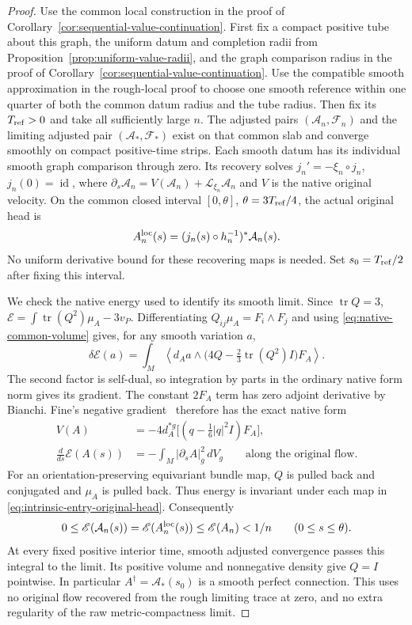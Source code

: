 \documentclass[11pt]{article}
\numberwithin{equation}{section}
\theoremstyle{definition}
\theoremstyle{remark}
\DeclareMathOperator{\tr}{tr}
\newcommand{\id}{\operatorname{id}}
\begin{document}
\begin{proof}
Use the common local construction in the proof of
Corollary~\ref{cor:sequential-value-continuation}.
First fix a compact positive tube about this graph, the
uniform datum and completion radii from
Proposition~\ref{prop:uniform-value-radii}, and the graph
comparison radius in the proof of
Corollary~\ref{cor:sequential-value-continuation}.
Use the compatible smooth approximation in the rough-local
proof to choose one smooth reference within one quarter of
both the common datum radius and the tube radius. Then fix
its $T_{\rm ref}>0$ and take all sufficiently large $n$.
The adjusted pairs $(\mathcal A_n,\mathcal F_n)$ and the
limiting adjusted pair $(\mathcal A_*,\mathcal F_*)$ exist on
that common slab and converge smoothly on compact positive-time
strips. Each smooth datum has its individual smooth graph
comparison through zero. Its recovery solves
$j_n'=-\xi_n\circ j_n$, $j_n(0)=\id$, where
$\partial_s\mathcal A_n=V(\mathcal A_n)+
\mathcal L_{\xi_n}\mathcal A_n$ and $V$ is the native original
velocity. On the common closed interval
$[0,\theta]$, $\theta=3T_{\rm ref}/4$, the actual original head is
\begin{equation}\label{eq:intrinsic-entry-original-head}
 A_n^{\rm loc}(s)=(j_n(s)\circ h_n^{-1})^*\mathcal A_n(s).
\end{equation}
No uniform derivative bound for these recovering maps is
needed. Set $s_0=T_{\rm ref}/2$ after fixing this interval.

We check the native energy used to identify its smooth limit.
Since $\tr Q=3$,
$\mathscr E=\int\tr(Q^2)\mu_A-3v_P$.
Differentiating $Q_{ij}\mu_A=F_i\wedge F_j$ and using
\eqref{eq:native-common-volume} gives, for any smooth variation $a$,
\[
 \delta\mathscr E(a)=\int_M\left\langle d_Aa\wedge
       \bigl(4Q-\tfrac23\tr(Q^2)I\bigr)F_A\right\rangle.
\]
The second factor is self-dual, so integration by parts in
the ordinary native form norm gives its gradient.
The constant $2F_A$ term has zero adjoint derivative by
Bianchi. Fine's negative gradient~\cite[\S4.1, Proposition~4.2, (4.1)]{Fine2011}
therefore has the exact native form
\begin{equation}\label{eq:native-defect-energy-dissipation}
 \begin{split}
 V(A)&=-4d_A^{*g}\bigl[(q-\tfrac16|q|^2I)F_A\bigr],\\
 \frac{d}{ds}\mathscr E(A(s))
       &=-\int_M|\partial_sA|_g^2\,dV_g
 \qquad\text{along the original flow}.
 \end{split}
\end{equation}
For an orientation-preserving equivariant bundle map, $Q$
is pulled back and conjugated and $\mu_A$ is pulled back.
Thus energy is invariant under each map in
\eqref{eq:intrinsic-entry-original-head}. Consequently
\[
 0\le\mathscr E(\mathcal A_n(s))
   =\mathscr E(A_n^{\rm loc}(s))
   \le\mathscr E(A_n)<1/n\qquad(0\le s\le\theta).
\]
At every fixed positive interior time, smooth adjusted
convergence passes this integral to the limit. Its positive
volume and nonnegative density give $Q=I$ pointwise.
In particular $A^\dagger=\mathcal A_*(s_0)$ is a smooth
perfect connection. This uses no original flow recovered
from the rough limiting trace at zero, and no extra
regularity of the raw metric-compactness limit.


\end{proof}
\end{document}
